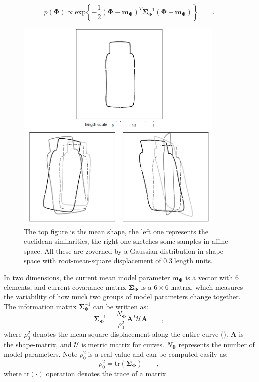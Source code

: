 \begin{equation}
  \label{eq:prior}
   p(\mathbf{\Phi}) \propto
\mathrm{exp} \left\{ -\frac{1}{2} (\mathbf{\Phi} -
  \mathbf{m}_{\mathbf{\Phi}})^T \mathbf{\Sigma}_{\mathbf{\Phi}}^{-1} (\mathbf{\Phi} -
  \mathbf{m}_{\mathbf{\Phi}}) \right\}\qquad.
\end{equation}

\begin{figure}[htb]
  \centering
  \includegraphics[width=10cm]{images/prior.jpg}
\caption[Sampling from curve families~\cite{blake1998active}]{The top
  figure is the mean shape, the left one represents the euclidean
  similarities, the right one
  sketches some samples in affine space. All these are governed by a
  Gaussian distribution in shape-space with root-mean-square
  displacement of 0.3 length units.}
\label{fig:transform}
\end{figure}

In two dimensions, the current mean model parameter
$\mathbf{m}_{\mathbf{\Phi}}$ is a vector with $6$ elements, and current
covariance matrix $\mathbf{\Sigma}_{\mathbf{\Phi}}$ is a $6 \times 6$ matrix, which measures the variability of
how much two groups of model parameters change together. The
information matrix $\mathbf{\Sigma}_{\mathbf{\Phi}}^{-1}$ can be
written as:
\begin{equation}
  \label{eq:infomatrix}
  \mathbf{\Sigma}_{\mathbf{\Phi}}^{-1} = \frac{N_{\mathbf{\Phi}}}{\rho_0^2} \mathbf{A}^T\mathcal{U}\mathbf{A}\qquad,
\end{equation}
where $\rho_0^2$ denotes the mean-square displacement along the entire
curve (\cite{blake1998active}). $\mathbf{A}$ is the shape-matrix, and $\mathcal{U}$ is
metric matrix for curves. $N_{\mathbf{\Phi}}$ represents
the number of model parameters. Note $\rho_0^2$
is a real value and can be computed easily as:
\begin{equation}
  \label{eq:trace}
  \rho_0^2 = \mathrm{tr}(\mathbf{\Sigma}_{\mathbf{\Phi}})\qquad,
\end{equation}
where $\mathrm{tr}(\cdot)$ operation denotes the trace of a matrix.

